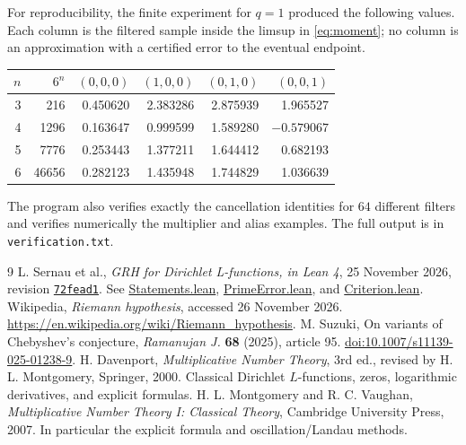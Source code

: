 \documentclass[11pt]{article}
\theoremstyle{remark}\newtheorem{remark}[theorem]{Remark}
\begin{document}
For reproducibility, the finite experiment for $q=1$ produced the following values. Each column is the filtered sample inside the limsup in \eqref{eq:moment}; no column is an approximation with a certified error to the eventual endpoint.
\begin{center}
\small
\begin{tabular}{rrrrrr}
\toprule
$n$ & $6^n$ & $(0,0,0)$ & $(1,0,0)$ & $(0,1,0)$ & $(0,0,1)$\\
\midrule
3 & 216 & 0.450620 & 2.383286 & 2.875939 & 1.965527\\
4 & 1296 & 0.163647 & 0.999599 & 1.589280 & $-0.579067$\\
5 & 7776 & 0.253443 & 1.377211 & 1.644412 & 0.682193\\
6 & 46656 & 0.282123 & 1.435948 & 1.744829 & 1.036639\\
\bottomrule
\end{tabular}
\end{center}
The program also verifies exactly the cancellation identities for $64$ different filters and verifies numerically the multiplier and alias examples. The full output is in \texttt{verification.txt}.

\begin{thebibliography}{9}
 L. Sernau et al., \emph{GRH for Dirichlet L-functions, in Lean 4}, 25 November 2026, revision \href{https://github.com/lsernau/grh-lean/tree/72fead102f663d5c7a407964a13dc0cf9d977207}{\texttt{72fead1}}. See \href{https://github.com/lsernau/grh-lean/blob/72fead102f663d5c7a407964a13dc0cf9d977207/grh/src/Statements.lean}{Statements.lean}, \href{https://github.com/lsernau/grh-lean/blob/72fead102f663d5c7a407964a13dc0cf9d977207/grh/src/New/Reduction/Zeros/PrimeError.lean}{PrimeError.lean}, and \href{https://github.com/lsernau/grh-lean/blob/72fead102f663d5c7a407964a13dc0cf9d977207/grh/src/New/Reduction/Zeros/Criterion.lean}{Criterion.lean}.
 Wikipedia, \emph{Riemann hypothesis}, accessed 26 November 2026. \url{https://en.wikipedia.org/wiki/Riemann_hypothesis}.
 M. Suzuki, On variants of Chebyshev's conjecture, \emph{Ramanujan J.} \textbf{68} (2025), article 95. \href{https://doi.org/10.1007/s11139-025-01238-9}{doi:10.1007/s11139-025-01238-9}.
 H. Davenport, \emph{Multiplicative Number Theory}, 3rd ed., revised by H. L. Montgomery, Springer, 2000. Classical Dirichlet $L$-functions, zeros, logarithmic derivatives, and explicit formulas.
 H. L. Montgomery and R. C. Vaughan, \emph{Multiplicative Number Theory I: Classical Theory}, Cambridge University Press, 2007. In particular the explicit formula and oscillation/Landau methods.
\end{thebibliography}
\end{document}
